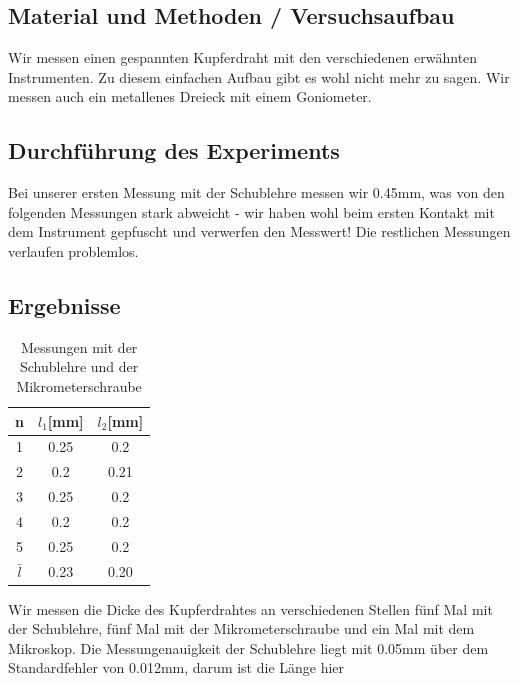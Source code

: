 \documentclass{article}
\begin{document}
\subsection{Material und Methoden / Versuchsaufbau}
Wir messen einen gespannten Kupferdraht mit den verschiedenen erwähnten Instrumenten. Zu diesem einfachen Aufbau gibt es wohl nicht mehr zu sagen. Wir messen auch ein metallenes Dreieck mit einem Goniometer.
\subsection{Durchführung des Experiments}
Bei unserer ersten Messung mit der Schublehre messen wir 0.45mm, was von den folgenden Messungen stark abweicht - wir haben wohl beim ersten Kontakt mit dem Instrument gepfuscht und verwerfen den Messwert! Die restlichen Messungen verlaufen problemlos.
\subsection{Ergebnisse}

\begin{table}
\centering
\begin{tabular}{|c|c|c|}
\hline
n&$l_1$[mm]&$l_2$[mm]\\
\hline
\hline
1&0.25&0.2\\
2&0.2&0.21\\
3&0.25&0.2\\
4&0.2&0.2\\
5&0.25&0.2\\
\hline 
$\bar{l}$&0.23&0.20\\
\hline
\end{tabular}
\caption{Messungen mit der Schublehre und der Mikrometerschraube}
\end{table}

Wir messen die Dicke des Kupferdrahtes an verschiedenen Stellen  fünf Mal mit der Schublehre, fünf Mal mit der Mikrometerschraube und ein Mal mit dem Mikroskop.  Die Messungenauigkeit der Schublehre liegt mit 0.05mm über dem Standardfehler von 0.012mm, darum ist die Länge hier
\end{document}
